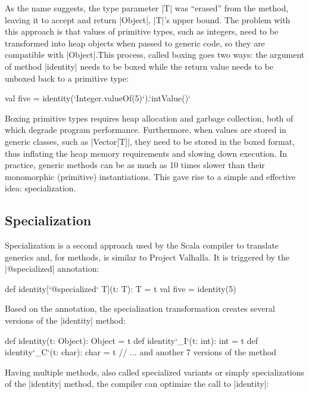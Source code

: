 As the name suggests, the type parameter |T| was ``erased'' from the method, leaving it to accept and return |Object|, |T|'s upper bound. The problem with this approach is that values of primitive types, such as integers, need to be transformed into heap objects when passed to generic code, so they are compatible with |Object|.This process, called boxing goes two ways: the argument of method |identity| needs to be boxed while the return value needs to be unboxed back to a primitive type:

\begin{lstlisting-nobreak}
 val five = identity(`Integer.valueOf(5)`).`intValue()`
\end{lstlisting-nobreak}

Boxing primitive types requires heap allocation and garbage collection, both of which degrade program performance. Furthermore, when values are stored in generic classes, such as |Vector[T]|, they need to be stored in the boxed format, thus inflating the heap memory requirements and slowing down execution. In practice, generic methods can be as much as 10 times slower than their monomorphic (primitive) instantiations. This gave rise to a simple and effective idea: specialization.

\subsection{Specialization}

Specialization \cite{specialization-iuli, iuli-thesis} is a second approach used by the Scala compiler to translate generics and, for methods, is similar to Project Valhalla. It is triggered by the |@specialized| annotation:

\begin{lstlisting-nobreak}
 def identity[`@specialized` T](t: T): T = t
 val five = identity(5)
\end{lstlisting-nobreak}

Based on the annotation, the specialization transformation creates several versions of the |identity| method:

\begin{lstlisting-nobreak}
 def identity(t: Object): Object = t
 def identity`_I`(t: int): int = t
 def identity`_C`(t: char): char = t
 // ... and another 7 versions of the method
\end{lstlisting-nobreak}

Having multiple methods, also called specialized variants or simply specializations of the |identity| method, the compiler can optimize the call to |identity|:

